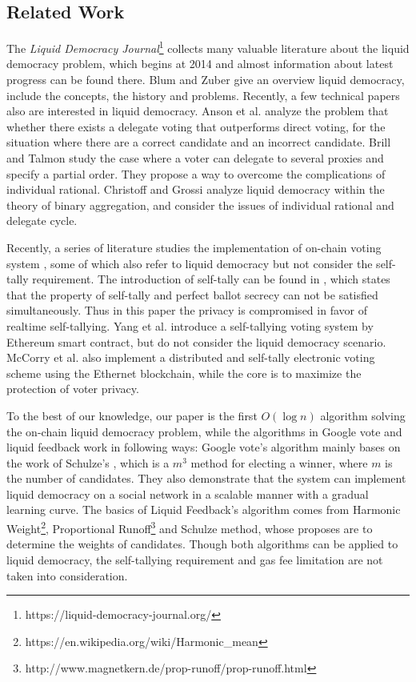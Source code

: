 \subsection{Related Work}
The {\em Liquid Democracy Journal}\footnote{https://liquid-democracy-journal.org/} collects many valuable literature about the liquid democracy problem, which begins at 2014 and almost information about latest progress can be found there. Blum and Zuber\cite{blum2016liquid} give an overview liquid democracy, include the concepts, the history and problems. Recently, a few technical papers also are interested in liquid democracy. Anson et al. \cite{kahng2018liquid} analyze the problem that whether there exists a delegate voting that outperforms direct voting, for the situation where there are a correct candidate and an incorrect candidate. Brill and Talmon \cite{brill2018pairwise} study the case where a voter can delegate to several proxies and specify a partial order. They propose a way to overcome the complications of individual rational. Christoff and Grossi \cite{christoff2017binary} analyze liquid democracy within the theory of binary aggregation, and consider the issues of individual rational and delegate cycle. 

 Recently, a series of literature studies the implementation of on-chain voting system \cite{hanifatunnisa2017blockchain,hjalmarsson2018blockchain}, some of which also refer to liquid democracy but not consider the self-tally requirement. The introduction of self-tally can be found in \cite{kiayias2002self}, which states that the property of self-tally and perfect ballot secrecy can not be satisfied simultaneously. Thus in this paper the privacy is compromised in favor of realtime self-tallying. Yang et al.\cite{yang2018decentralized} introduce a self-tallying voting system by Ethereum smart contract, but do not consider the liquid democracy scenario. McCorry et al. \cite{mccorry2017smart} also implement a distributed and self-tally electronic voting scheme using the Ethernet blockchain, while the core is to maximize the protection of voter privacy. 

To the best of our knowledge, our paper is the first $O(\log n)$ algorithm solving the on-chain liquid democracy problem, while the algorithms in Google vote and liquid feedback work in following ways: Google vote's algorithm mainly bases on the work of Schulze's \cite{schulze2011new}, which is a $m^3$ method for electing a winner, where $m$ is the number of candidates. They also demonstrate that the system can implement liquid democracy on a social network in a scalable manner with a gradual learning curve. The basics of Liquid Feedback's algorithm comes from Harmonic Weight\footnote{https://en.wikipedia.org/wiki/Harmonic\_mean}, Proportional Runoff\footnote{http://www.magnetkern.de/prop-runoff/prop-runoff.html} and Schulze method, whose proposes are to determine the weights of candidates. Though both  algorithms can be applied to liquid democracy, the self-tallying requirement and gas fee limitation are not taken into consideration.